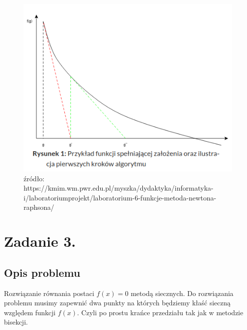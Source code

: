 \documentclass[12pt]{article}
\begin{document}
\begin{figure}[htp]
    \caption{źródło: https://kmim.wm.pwr.edu.pl/myszka/dydaktyka/informatyka-i/laboratoriumprojekt/laboratorium-6-funkcje-metoda-newtona-raphsona/}
    \centering
    \includegraphics[width=12cm]{st1.png}
\end{figure}
\newpage
\section{Zadanie 3.}

\subsection{Opis problemu}
Rozwiązanie równania postaci $ f(x) = 0 $ metodą siecznych.
Do rozwiązania problemu musimy zapewnić dwa punkty na których będziemy kłaść sieczną względem
funkcji $f(x)$. Czyli po prostu krańce przedziału tak jak w metodzie bisekcji.
\end{document}
